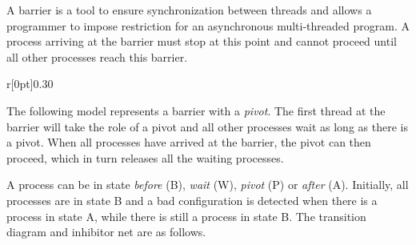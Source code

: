 A barrier is a tool to ensure synchronization between threads and
allows a programmer to impose restriction for an asynchronous
multi-threaded program.
%
A process arriving at the barrier must stop at this point and cannot
proceed until all other processes reach this barrier.

\begin{wrapfigure}{r}[0pt]{0.30\linewidth}
  \hfill%
  \vspace{-28pt}
  \vspace{-20pt}
\end{wrapfigure}
%
The following model represents a barrier with a \emph{pivot}. The
first thread at the barrier will take the role of a pivot and all
other processes wait as long as there is a pivot. When all processes
have arrived at the barrier, the pivot can then proceed, which in turn
releases all the waiting processes.

A process can be in state \emph{before} (B), \emph{wait} (W),
\emph{pivot} (P) or \emph{after} (A). %
%
Initially, all processes are in state B and a bad configuration is
detected when there is a process in state A, while there is still a
process in state B.
%
The transition diagram and inhibitor net are as follows.

